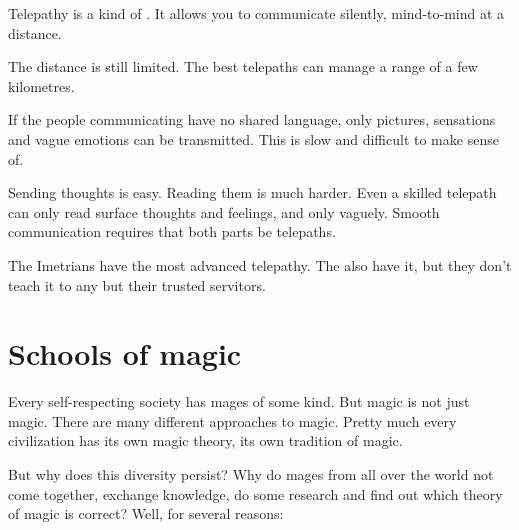 Telepathy is a kind of . 
It allows you to communicate silently, mind-to-mind at a distance. 

The distance is still limited. 
The best telepaths can manage a range of a few kilometres. 

If the people communicating have no shared language, only pictures, sensations and vague emotions can be transmitted. This is slow and difficult to make sense of. 

Sending thoughts is easy. 
Reading them is much harder. 
Even a skilled telepath can only read surface thoughts and feelings, and only vaguely. 
Smooth communication requires that both parts be telepaths. 

The Imetrians have the most advanced telepathy. 
The \banes{} also have it, but they don't teach it to any but their trusted servitors. 















\section{Schools of magic}
Every self-respecting society has mages of some kind. But magic is not just magic. There are many different approaches to magic. Pretty much every civilization has its own magic theory, its own tradition of magic. 

But why does this diversity persist? Why do mages from all over the world not come together, exchange knowledge, do some research and find out which theory of magic is correct? Well, for several reasons: 

